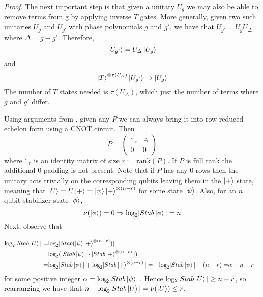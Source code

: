 \documentclass[12pt]{dalthesis}
\begin{document}
\begin{proof}
The next important step is that given a unitary $U_g$ we may also be able to remove terms from g by applying inverse $T$ gates. More generally, given two such unitaries $U_g$ and $U_{g'}$ with phase polynomials $g$ and $g'$, we have that $U_{g'} = U_g U_{\Delta}$ where $\Delta = g - g'$. Therefore, 
\begin{equation}
\ket{U_{g'}} = U_{\Delta} \ket{U_g}
\end{equation}
and 
\begin{equation}
\ket{T}^{\otimes \tau (U_{\Delta})} \ket{U_{g'}} \rightarrow \ket{U_g}
\end{equation}
The number of $T$ states needed is $\tau (U_{\Delta})$, which just the number of terms where $g$ and $g'$ differ.

Using arguments from \cite{?}, given any $P$ we can always bring it into row-reduced echelon form using a CNOT circuit. Then
\begin{equation}
P = \begin{pmatrix}
\mathds{1}_r & A \\
0 & 0
\end{pmatrix}
\end{equation}
where $\mathds{1}_r$ is an identity matrix of size $r := \text{rank}(P)$. If $P$ is full rank the additional 0 padding is not present. Note that if $P$ has any 0 rows then the unitary acts trivially on the corresponding qubits leaving them in the $\ket{+}$ state, meaning that $\ket{U} = U\ket{+} = \ket{\psi}\ket{+}^{\otimes (n-r)}$ for some state $\ket{\psi}$. Also, for an $n$ qubit stabilizer state $\ket{\phi}$, 
\begin{equation}
\nu (\ket{\phi}) = 0 \Rightarrow \text{log}_2 |Stab\ket{\phi}| = n
\end{equation} 
Next, observe that 


\begin{align*}
\text{log}_2 |Stab\ket{U}| = & \text{log}_2|Stab(\ket{\psi}\ket{+}^{\otimes (n-r)})| \\ 
= & \text{log}_2 (|Stab \ket{\psi}| \cdot |Stab\ket{+}^{\otimes (n-r)}|) \\
= & \text{log}_2 |Stab \ket{\psi}| + \text{log}_2 |Stab \ket{+}^{\otimes (n-r)}|
= & \text{log}_2 |Stab \ket{\psi}| + (n-r)
= & \alpha + n - r
\end{align*}
for some positive integer $\alpha = \text{log}_2 |Stab \ket{\psi}|$. Hence log$_2|Stab\ket{U}| \geq n - r$, so rearranging we have that $n - \text{log}_2 |Stab \ket{U}| = \nu (\ket{U}) \leq r$.


\end{proof}
\end{document}
